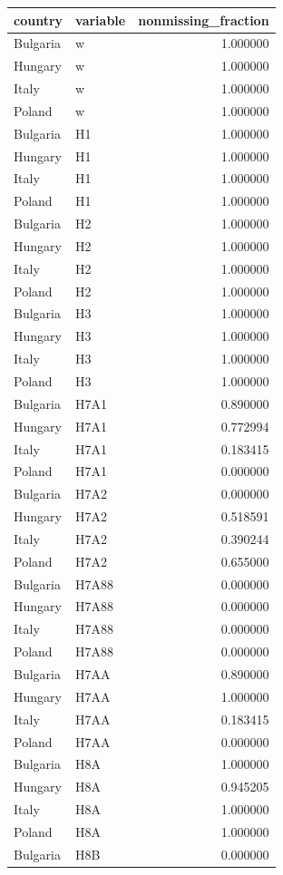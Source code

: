 \begin{tabular}{llr}
\toprule
country & variable & nonmissing_fraction \\
\midrule
Bulgaria & w & 1.000000 \\
Hungary & w & 1.000000 \\
Italy & w & 1.000000 \\
Poland & w & 1.000000 \\
Bulgaria & H1 & 1.000000 \\
Hungary & H1 & 1.000000 \\
Italy & H1 & 1.000000 \\
Poland & H1 & 1.000000 \\
Bulgaria & H2 & 1.000000 \\
Hungary & H2 & 1.000000 \\
Italy & H2 & 1.000000 \\
Poland & H2 & 1.000000 \\
Bulgaria & H3 & 1.000000 \\
Hungary & H3 & 1.000000 \\
Italy & H3 & 1.000000 \\
Poland & H3 & 1.000000 \\
Bulgaria & H7A1 & 0.890000 \\
Hungary & H7A1 & 0.772994 \\
Italy & H7A1 & 0.183415 \\
Poland & H7A1 & 0.000000 \\
Bulgaria & H7A2 & 0.000000 \\
Hungary & H7A2 & 0.518591 \\
Italy & H7A2 & 0.390244 \\
Poland & H7A2 & 0.655000 \\
Bulgaria & H7A88 & 0.000000 \\
Hungary & H7A88 & 0.000000 \\
Italy & H7A88 & 0.000000 \\
Poland & H7A88 & 0.000000 \\
Bulgaria & H7AA & 0.890000 \\
Hungary & H7AA & 1.000000 \\
Italy & H7AA & 0.183415 \\
Poland & H7AA & 0.000000 \\
Bulgaria & H8A & 1.000000 \\
Hungary & H8A & 0.945205 \\
Italy & H8A & 1.000000 \\
Poland & H8A & 1.000000 \\
Bulgaria & H8B & 0.000000 \\

\end{tabular}
